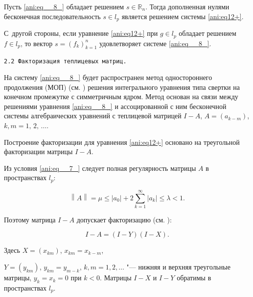 Пусть \eqref{ani:eq__8_} обладает решением  $s\in \mathbb R_{n} $. Тогда дополненная нулями бесконечная последовательность $s\in l_{p} $ является решением системы  \eqref{ani:eq12+}. 

С~другой стороны, если уравнение \eqref{ani:eq12+} при $g\in l_{p}$ обладает решением $f\in l_{p} $, то вектор $s=\left(f_{k} \right)_{k=1}^{n} $ удовлетворяет системе \eqref{ani:eq__8_}.



\smallskip



\texttt{2.2 Факторизация теплицевых матриц.}

На систему \eqref{ani:eq__8_} будет распространен метод одностороннего продолжения (МОП) (см. \cite{ani:Izv}) решения интегрального уравнения типа свертки на конечном промежутке с симметричным ядром. Метод основан на связи между решениями уравнения \eqref{ani:eq__8_} и ассоцированной с ним бесконечной системы алгебраических уравнений с теплицевой матрицей $I-A$, $A=\left(a_{k-m} \right)$, $k,m=1,\, 2,\, \ldots $.



Построение факторизации для уравнения \eqref{ani:eq12+} основано на треугольной факторизации матрицы $I-A$. 

Из условия \eqref{ani:eq__7_}  следует полная регулярность матрицы $A$ в пространствах $l_p$:

\begin{equation}\label{ani:eq13}

\left\| A\right\| =\mu \le \left|a_{0} \right|+2\sum\limits _{k=1}^{\infty }\left|a_{k} \right| \le \lambda <1.

\end{equation}



Поэтому  матрица $I-A$ допускает  факторизацию (см. \cite{ani:Kr}):

\begin{equation}\label{ani:eq15}

I-A= (I-Y)  (I-X) .

\end{equation}



Здесь $X=(x_{km} )$, $x_{km} =x_{k-m} $, 

$Y=(y_{km} )$, $y_{km} =y_{m-k} $, $k,m=1, 2,\ldots $ "--- нижняя  и верхняя треугольные матрицы, $y_{k} =x_{k} =0$ при $k<0$. Матрицы $I-X$ и $I-Y$ обратимы в пространствах $l_{p} $.



